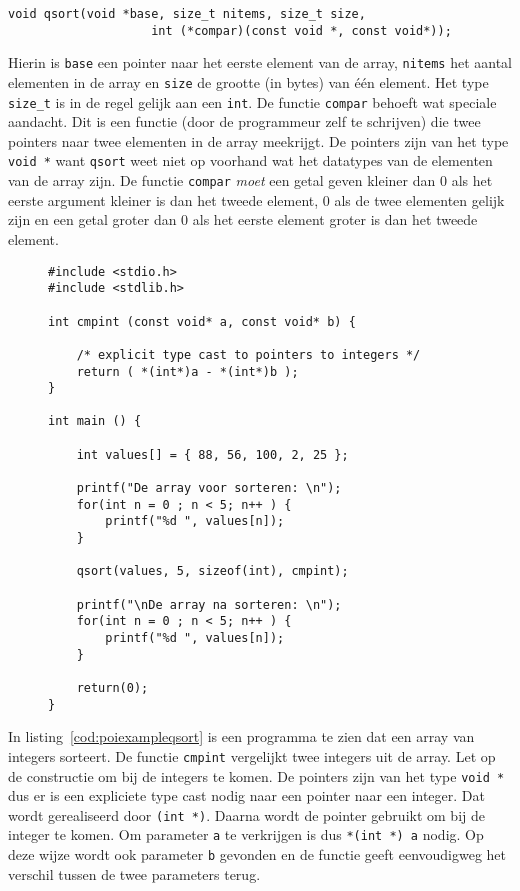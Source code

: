 \hspace*{1em}\texttt{void qsort(void *base, size\_t nitems, size\_t size,}\\
\hspace*{1em}\texttt{\ \ \ \ \ \ \ \ \ \ \ \ \ \ \ \ \ \ \ \  int (*compar)(const void *, const void*));}

Hierin is \texttt{base} een pointer naar het eerste element van de array, \texttt{nitems} het aantal elementen in de array en \texttt{size} de grootte (in bytes) van één element. Het type \texttt{size\_t} is in de regel gelijk aan een \texttt{int}. De functie \texttt{compar} behoeft wat speciale aandacht. Dit is een functie (door de programmeur zelf te schrijven) die twee pointers naar twee elementen in de array meekrijgt. De pointers zijn van het type \texttt{void~*} want \texttt{qsort} weet niet op voorhand wat het datatypes van de elementen van de array zijn. De functie \texttt{compar} \textsl{moet} een getal geven kleiner dan 0 als het eerste argument kleiner is dan het tweede element, 0 als de twee elementen gelijk zijn en een getal groter dan 0 als het eerste element groter is dan het tweede element.

\begin{figure}[!ht]
\begin{lstlisting}[caption=Sorteren van een array met quicksort.,label=cod:poiexampleqsort]
#include <stdio.h>
#include <stdlib.h>

int cmpint (const void* a, const void* b) {

    /* explicit type cast to pointers to integers */
    return ( *(int*)a - *(int*)b );
}

int main () {

    int values[] = { 88, 56, 100, 2, 25 };

    printf("De array voor sorteren: \n");
    for(int n = 0 ; n < 5; n++ ) {
        printf("%d ", values[n]);
    }

    qsort(values, 5, sizeof(int), cmpint);

    printf("\nDe array na sorteren: \n");
    for(int n = 0 ; n < 5; n++ ) {
        printf("%d ", values[n]);
    }

    return(0);
}
\end{lstlisting}
\end{figure}

In listing~\ref{cod:poiexampleqsort} is een programma te zien dat een array van integers sorteert. De functie \texttt{cmpint} vergelijkt twee integers uit de array. Let op de constructie om bij de integers te komen. De pointers zijn van het type \texttt{void~*} dus er is een expliciete type cast nodig naar een pointer naar een integer. Dat wordt gerealiseerd door \texttt{(int~*)}. Daarna wordt de pointer gebruikt om bij de integer te komen. Om parameter \texttt{a} te verkrijgen is dus \texttt{*(int~*)~a} nodig. Op deze wijze wordt ook parameter \texttt{b} gevonden en de functie geeft eenvoudigweg het verschil tussen de twee parameters terug.

